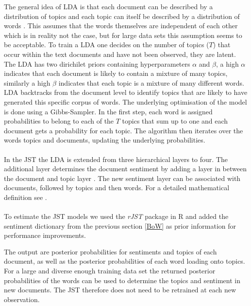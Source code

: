 The general idea of LDA is that each document can be described by a distribution of topics and each topic can itself be described by a distribution of words \citep{blei2003latent}. This assumes that the words themselves are independent of each other which is in reality not the case, but for large data sets this assumption seems to be acceptable. To train a LDA one decides on the number of topics ($T$) that occur within the text documents and have not been observed, they are latent. The LDA has two dirichilet priors containing hyperparameters $\alpha$ and $\beta$, a high $\alpha$ indicates that each document is likely to contain a mixture of many topics, similarly a high $\beta$ indicates that each topic is a mixture of many different words. LDA backtracks from the document level to identify topics that are likely to have generated this specific corpus of words. The underlying optimisation of the model is done using a Gibbs-Sampler. In the first step, each word is assigned probabilities to belong to each of the $T$ topics that sum up to one and each document gets a probability for each topic. The algorithm then iterates over the words topics and documents, updating the underlying probabilities. \\ \\
In the JST the LDA is extended from three hierarchical layers to four. The additional layer determines the document sentiment by adding a layer in between the document and topic layer \citep{lin2009joint}. The new sentiment layer can be associated with documents, followed by topics and then words. For a detailed mathematical definition see \citet{lin2009joint}. \\ \\
To estimate the JST models we used the \textit{rJST} package in R \citep{rJST} and added the sentiment dictionary from the previous section \ref{BoW} as prior information for performance improvements.

The output are posterior probabilities for sentiments and topics of each document, as well as the posterior probabilities of each word loading onto topics. For a large and diverse enough training data set the returned posterior probabilities of the words can be used to determine the topics and sentiment in new documents. The JST therefore does not need to be retrained at each new observation. \\





